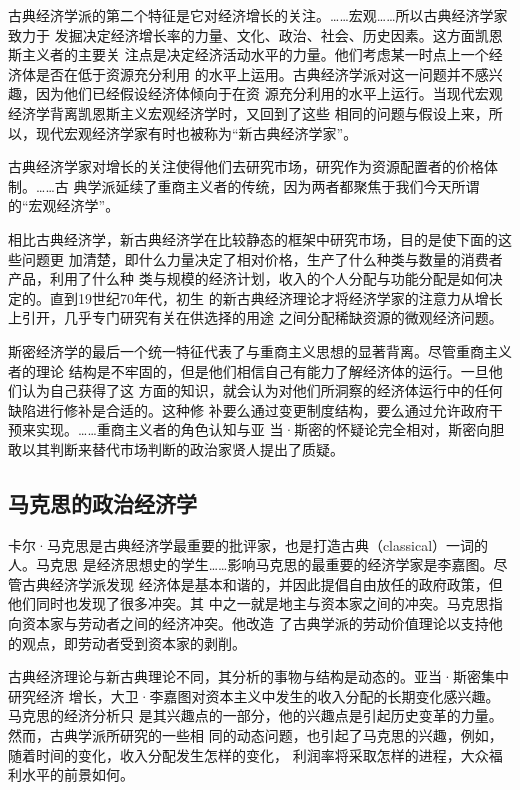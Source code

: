 古典经济学派的第二个特征是它对经济增长的关注。……宏观……所以古典经济学家致力于
发掘决定经济增长率的力量、文化、政治、社会、历史因素。这方面凯恩斯主义者的主要关
注点是决定经济活动水平的力量。他们考虑某一时点上一个经济体是否在低于资源充分利用
的水平上运用。古典经济学派对这一问题并不感兴趣，因为他们已经假设经济体倾向于在资
源充分利用的水平上运行。当现代宏观经济学背离凯恩斯主义宏观经济学时，又回到了这些
相同的问题与假设上来，所以，现代宏观经济学家有时也被称为“新古典经济学家”。

古典经济学家对增长的关注使得他们去研究市场，研究作为资源配置者的价格体制。……古
典学派延续了重商主义者的传统，因为两者都聚焦于我们今天所谓的“宏观经济学”。

相比古典经济学，新古典经济学在比较静态的框架中研究市场，目的是使下面的这些问题更
加清楚，即什么力量决定了相对价格，生产了什么种类与数量的消费者产品，利用了什么种
类与规模的经济计划，收入的个人分配与功能分配是如何决定的。直到19世纪70年代，初生
的新古典经济理论才将经济学家的注意力从增长上引开，几乎专门研究有关在供选择的用途
之间分配稀缺资源的微观经济问题。

斯密经济学的最后一个统一特征代表了与重商主义思想的显著背离。尽管重商主义者的理论
结构是不牢固的，但是他们相信自己有能力了解经济体的运行。一旦他们认为自己获得了这
方面的知识，就会认为对他们所洞察的经济体运行中的任何缺陷进行修补是合适的。这种修
补要么通过变更制度结构，要么通过允许政府干预来实现。……重商主义者的角色认知与亚
当·斯密的怀疑论完全相对，斯密向胆敢以其判断来替代市场判断的政治家贤人提出了质疑。

\subsection*{马克思的政治经济学}

卡尔·马克思是古典经济学最重要的批评家，也是打造古典（classical）一词的人。马克思
是经济思想史的学生……影响马克思的最重要的经济学家是李嘉图。尽管古典经济学派发现
经济体是基本和谐的，并因此提倡自由放任的政府政策，但他们同时也发现了很多冲突。其
中之一就是地主与资本家之间的冲突。马克思指向资本家与劳动者之间的经济冲突。他改造
了古典学派的劳动价值理论以支持他的观点，即劳动者受到资本家的剥削。

古典经济理论与新古典理论不同，其分析的事物与结构是动态的。亚当·斯密集中研究经济
增长，大卫·李嘉图对资本主义中发生的收入分配的长期变化感兴趣。马克思的经济分析只
是其兴趣点的一部分，他的兴趣点是引起历史变革的力量。然而，古典学派所研究的一些相
同的动态问题，也引起了马克思的兴趣，例如，随着时间的变化，收入分配发生怎样的变化，
利润率将采取怎样的进程，大众福利水平的前景如何。

